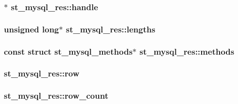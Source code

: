 \subsubsection[{handle}]{$\ast$ st\+\_\+mysql\+\_\+res\+::handle}\label{structst__mysql__res_ac67d314af96af560ea7880245ab5a710}
\hypertarget{structst__mysql__res_ac6b5b0d8456fe15d529ece8c107d7063}{}
\subsubsection[{lengths}]{\setlength{\rightskip}{0pt plus 5cm}unsigned long$\ast$ st\+\_\+mysql\+\_\+res\+::lengths}\label{structst__mysql__res_ac6b5b0d8456fe15d529ece8c107d7063}
\hypertarget{structst__mysql__res_a87d087d083eb50c81b30285a7b8458b1}{}
\subsubsection[{methods}]{\setlength{\rightskip}{0pt plus 5cm}const struct st\+\_\+mysql\+\_\+methods$\ast$ st\+\_\+mysql\+\_\+res\+::methods}\label{structst__mysql__res_a87d087d083eb50c81b30285a7b8458b1}
\hypertarget{structst__mysql__res_a12b56773449e21072694f7749086d64a}{}
\subsubsection[{row}]{ st\+\_\+mysql\+\_\+res\+::row}\label{structst__mysql__res_a12b56773449e21072694f7749086d64a}
\hypertarget{structst__mysql__res_aeebcaa8a317200a20bbde5d9f9f73169}{}
\subsubsection[{row\+\_\+count}]{ st\+\_\+mysql\+\_\+res\+::row\+\_\+count}\label{structst__mysql__res_aeebcaa8a317200a20bbde5d9f9f73169}
\hypertarget{structst__mysql__res_a4fddbf81b6ead57fdfd384e74d918cfb}{}
